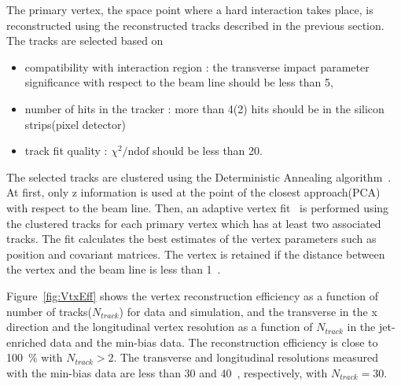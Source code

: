 The primary vertex, the space point where a hard interaction takes place,
is reconstructed using the reconstructed tracks described in the previous section. 
The tracks are selected based on 
\begin{itemize}
\item compatibility with interaction region : the transverse impact parameter 
      significance with respect to the beam line should be less than 5, 
\item number of hits in the tracker : more than 4(2) hits should be 
      in the silicon strips(pixel detector) 
\item track fit quality : $\chi^2/\textrm{ndof}$ should be less than 20.
\end{itemize}
The selected tracks are clustered using the Deterministic Annealing 
algorithm~\cite{DAclustering}.
At first, only z information is used at the point of the closest approach(PCA) with 
respect to the beam line. 
Then, an adaptive vertex fit~\cite{AdaptiveVertexFit} is performed using the clustered tracks 
for each primary vertex
which has at least two associated tracks. The fit calculates the best estimates 
of the vertex parameters such as position and covariant matrices. 
The vertex is retained if the distance between the vertex and the beam line 
is less than 1~\cm.

Figure~\ref{fig:VtxEff} shows the vertex reconstruction efficiency as a function 
of number of tracks($N_{track}$) for data and simulation, 
and the transverse in the x direction and the longitudinal vertex resolution 
as a function of $N_{track}$ in the jet-enriched data and the min-bias data. 
The reconstruction efficiency is close to 100~\% with  
$N_{track}>2$. The transverse and longitudinal resolutions measured with 
the min-bias data are less than 30 and 40~\um, respectively, with $N_{track}=30$.

